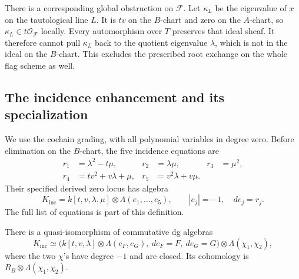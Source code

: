 There is a corresponding global obstruction on \(\mathscr F\).
Let \(\kappa_L\) be the eigenvalue of \(x\) on the
tautological line \(L\). It is \(tv\) on the \(B\)-chart
and zero on the \(A\)-chart, so
\(\kappa_L\in t\mathcal O_{\mathscr F}\) locally.
Every automorphism over \(T\) preserves that ideal sheaf.
It therefore cannot pull \(\kappa_L\) back to the quotient
eigenvalue \(\lambda\), which is not in the ideal on the
\(B\)-chart. This excludes the prescribed root exchange
on the whole flag scheme as well.

\subsection{The incidence enhancement and its specialization}

We use the cochain grading, with all polynomial variables
in degree zero. Before elimination on the \(B\)-chart,
the five incidence equations are
\[
\begin{aligned}
 r_1&=\lambda^2-t\mu,&r_2&=\lambda\mu,&r_3&=\mu^2,\\
 r_4&=tv^2+v\lambda+\mu,&r_5&=v^2\lambda+v\mu.
\end{aligned}
\]
Their specified derived zero locus has algebra
\begin{equation}\label{cyf:eq:incidence}
 K_{\mathrm{inc}}=k[t,v,\lambda,\mu]
       \otimes\Lambda(e_1,\ldots,e_5),
 \qquad |e_j|=-1,\quad de_j=r_j.
\end{equation}
The full list of equations is part of this definition.

\begin{theorem}\label{cyf:thm:syzygies}
There is a quasi-isomorphism of commutative dg algebras
\begin{equation}\label{cyf:eq:small}
 K_{\mathrm{inc}}\simeq
 \bigl(k[t,v,\lambda]\otimes\Lambda(e_F,e_G),
                  \ de_F=F,\ de_G=G\bigr)
                  \otimes\Lambda(\chi_1,\chi_2),
\end{equation}
where the two \(\chi\)'s have degree \(-1\) and are
closed. Its cohomology is
\(R_B\otimes\Lambda(\chi_1,\chi_2)\).
\end{theorem}

